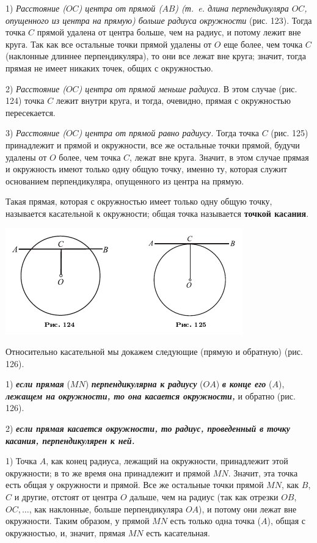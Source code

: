 \documentclass[oneside]{book}
\begin{document}
1) \emph{Расстояние \emph{($OC$)} центра от прямой \emph{($AB$) (т.~e.
длина перпендикуляра $OC$, опущенного из центра на прямую)} больше радиуса окружности} (рис. 123).
Тогда точка $C$ прямой удалена от центра больше, чем на радиус, и потому лежит вне круга.
Так как все остальные точки прямой удалены от $O$ еще более, чем точка $C$ (наклонные длиннее перпендикуляра), то они все лежат вне круга; значит, тогда прямая не имеет никаких точек, общих с окружностью.

2) \emph{Расстояние \emph{($OC$)} центра от прямой меньше радиуса.}
В этом случае (рис. 124) точка $C$ лежит внутри круга, и тогда, очевидно, прямая с окружностью пересекается.

3) \emph{Расстояние \emph{($OC$)} центра от прямой равно радиусу.}
Тогда точка $C$ (рис. 125) принадлежит и прямой и окружности, все же остальные точки прямой, будучи удалены от $O$ более, чем точка $C$, лежат вне круга.
Значит, в этом случае прямая и окружность имеют только одну общую точку, именно ту, которая служит основанием перпендикуляра, опущенного из центра на прямую.

Такая прямая, которая с окружностью имеет только одну общую точку, называется касательной к окружности;
общая точка называется \textbf{точкой касания}.

\includegraphics{pics/ris-124-125}


Относительно касательной мы докажем следующие  (прямую и обратную) (рис. 126).

1) \textbf{\emph{если прямая}} ($MN$) \textbf{\emph{перпендикулярна к радиусу}} ($OA$) \textbf{\emph{в конце его}} ($A$), \textbf{\emph{лежащем на окружности, то она касается окружности,}} и обратно (рис. 126).

2) \textbf{\emph{если прямая касается окружности, то радиус, проведенный в точку касания, перпендикулярен к ней.}}

1) Точка $A$, как конец радиуса, лежащий на окружности, принадлежит этой окружности;
в то же время она принадлежит и прямой $MN$.
Значит, эта точка есть общая у окружности и прямой.
Все же остальные точки прямой $MN$, как $B$, $C$ и другие, отстоят от центра $O$ дальше, чем на радиус (так как отрезки $OB$, $OC,\dots$, как наклонные, больше перпендикуляра $OA$), и потому они лежат вне окружности.
Таким образом, у прямой $MN$ есть только одна точка ($A$), общая с окружностью, и, значит, прямая $MN$ есть касательная.
\end{document}
